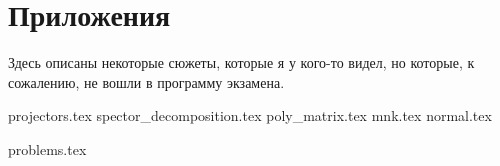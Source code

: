 \documentclass[a4paper, 11pt]{article}
\begin{document}
\newpage

\setcounter{problem}{0}

\section{Приложения}

Здесь описаны некоторые сюжеты, которые я у кого-то видел, но которые, к сожалению, не вошли в программу экзамена.

{projectors.tex}
{spector_decomposition.tex}
{poly_matrix.tex}
{mnk.tex}
{normal.tex}

\newpage

\setcounter{problem}{0}

{problems.tex}
\end{document}
